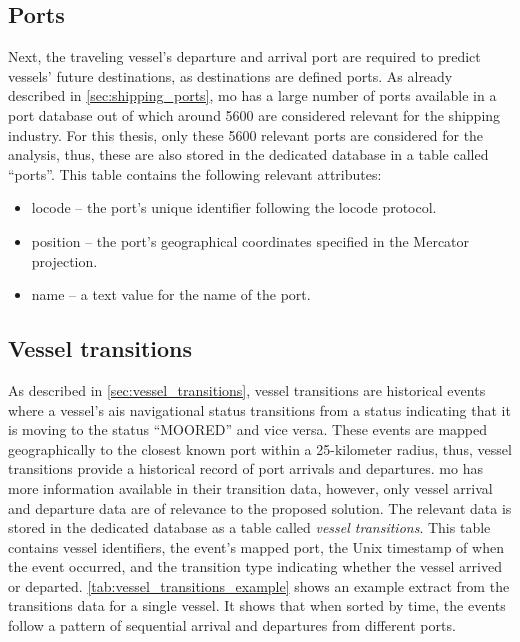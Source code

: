 \subsection{Ports}

Next, the traveling vessel's departure and arrival port are required to predict vessels' future destinations, as destinations are defined ports. As already described in \cref{sec:shipping_ports}, \acrshort{mo} has a large number of ports available in a port database out of which around 5600 are considered relevant for the shipping industry. For this thesis, only these 5600 relevant ports are considered for the analysis, thus, these are also stored in the dedicated database in a table called ``ports''. This table contains the following relevant attributes:

\begin{itemize}
    \item locode -- the port's unique identifier following the \gls{locode} protocol.
    \item position -- the port's geographical coordinates specified in the Mercator projection.
    \item name -- a text value for the name of the port.
\end{itemize}

\subsection{Vessel transitions}

As described in \cref{sec:vessel_transitions}, vessel transitions are historical events where a vessel's \acrshort{ais} navigational status transitions from a status indicating that it is moving to the status ``MOORED'' and vice versa. These events are mapped geographically to the closest known port within a 25-kilometer radius, thus, vessel transitions provide a historical record of port arrivals and departures. \acrshort{mo} has more information available in their transition data, however, only vessel arrival and departure data are of relevance to the proposed solution. The relevant data is stored in the dedicated database as a table called \textit{vessel transitions}. This table contains vessel identifiers, the event's mapped port, the Unix timestamp of when the event occurred, and the transition type indicating whether the vessel arrived or departed. \cref{tab:vessel_transitions_example} shows an example extract from the transitions data for a single vessel. It shows that when sorted by time, the events follow a pattern of sequential arrival and departures from different ports.

